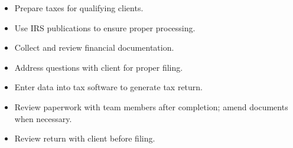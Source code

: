 \duties
\begin{itemize}[leftmargin=*]
    \item Prepare taxes for qualifying clients. 
    \item Use IRS publications to ensure proper processing. 
    \item Collect and review financial documentation.
    \item Address questions with client for proper filing.
    \item Enter data into tax software to generate tax return.
    \item Review paperwork with team members after completion; amend documents when necessary.
    \item Review return with client before filing.
\end{itemize}